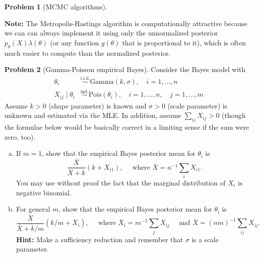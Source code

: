 \documentclass{article}
\newcommand{\simiid}{\overset{\text{i.i.d.}}{\sim}}
\newcommand{\simind}{\overset{\text{ind.}}{\sim}}
\theoremstyle{definition}
\newtheorem{problem}{Problem}
\begin{document}
\begin{problem}[MCMC algorithms]
\begin{enumerate}[(a)]
\end{enumerate}


{\bf Note:} The Metropolis-Hastings algorithm is computationally attractive because we can can always implement it using only the unnormalized posterior $p_\theta(X)\lambda(\theta)$ (or any function $g(\theta)$ that is proportional to it), which is often much easier to compute than the normalized posterior.
\end{problem}

\begin{problem}[Gamma-Poisson empirical Bayes]
Consider the Bayes model with 
\begin{align*}
  \theta_i &\simiid \text{Gamma}(k,\sigma), \quad i=1,\ldots,n\\
  X_{ij} \mid \theta_i &\simind \text{Pois}(\theta_i), \quad i=1,\ldots,n, \quad j = 1,\ldots,m
\end{align*}
Assume $k > 0$ (shape parameter) is known and $\sigma > 0$ (scale parameter) is unknown and estimated via the MLE. In addition, assume $\sum_{ij} X_{ij} > 0$ (though the formulae below would be basically correct in a limiting sense if the sum were zero, too).
\begin{enumerate}[(a)]
\item If $m = 1$, show that the empirical Bayes posterior mean for $\theta_i$ is
\[
\frac{\overline X}{\overline X + k} (k + X_{i1}), \quad \text{ where } \overline X = n^{-1}\sum_i X_{i1}.
\]
You may use without proof the fact that the marginal distribution of $X_i$ is negative binomial.



\item For general $m$, show that the empirical Bayes posterior mean for $\theta_i$ is
\[
\frac{\overline X}{\overline{X} + k/m} (k/m + \overline{X}_i), \quad \text{ where } \overline{X}_i = m^{-1}\sum_{j} X_{ij} \quad \text{ and } \overline{X} = (nm)^{-1}\sum_{ij} X_{ij}.
\]
{\bf Hint:} Make a sufficiency reduction and remember that $\sigma$ is a scale parameter.


\end{enumerate}
\end{problem}
\end{document}
